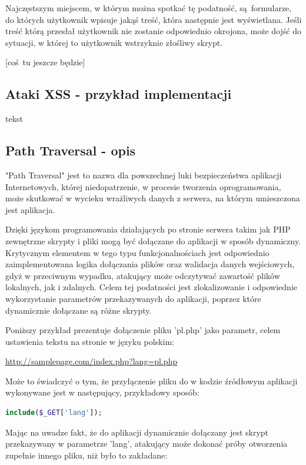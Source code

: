 \documentclass[12pt,twoside]{article}
\begin{document}
Najczęstszym miejscem, w którym można spotkać tę podatność, są formularze, do których użytkownik wpisuje jakąś treść, która następnie jest wyświetlana. Jeśli treść którą przesłał użytkownik nie zostanie odpowiednio okrojona, może dojść do sytuacji, w której to użytkownik wstrzyknie złośliwy skrypt.

[coś tu jeszcze będzie]

\subsection{Ataki XSS - przykład implementacji}
tekst
\subsection{Path Traversal - opis}

"Path Traversal" jest to nazwa dla powszechnej luki bezpieczeństwa aplikacji Internetowych, której niedopatrzenie, w procesie tworzenia oprogramowania, może skutkować w wycieku wrażliwych danych z serwera, na którym umieszczona jest aplikacja. 

Dzięki językom programowania działających po stronie serwera takim jak PHP zewnętrzne skrypty i pliki mogą być dołączane do aplikacji w sposób dynamiczny. Krytycznym elementem w tego typu funkcjonalnościach jest odpowiednio zaimplementowana logika dołączania plików oraz walidacja danych wejściowych, gdyż w przeciwnym wypadku, atakujący może odczytywać zawartość plików lokalnych, jak i zdalnych. Celem tej podatności jest zlokalizowanie i odpowiednie wykorzystanie parametrów przekazywanych do aplikacji, poprzez które dynamicznie dołączane są różne skrypty. 

Poniższy przykład prezentuje dołączenie pliku 'pl.php' jako parametr, celem ustawienia tekstu na stronie w języku polskim:

\url{http://samplepage.com/index.php?lang=pl.php}

Może to świadczyć o tym, że przyłączenie pliku do w kodzie źródłowym aplikacji wykonywane jest w następujący, przykładowy sposób:

\begin{lstlisting}[language=PHP,caption=Listing programu PHP,label={KodPHP1}]
	include($_GET['lang']);
\end{lstlisting}

Mając na uwadze fakt, że do aplikacji dynamicznie dołączany jest skrypt przekazywany w parametrze 'lang', atakujący może dokonać próby otworzenia zupełnie innego pliku, niż było to zakładane:
\end{document}
